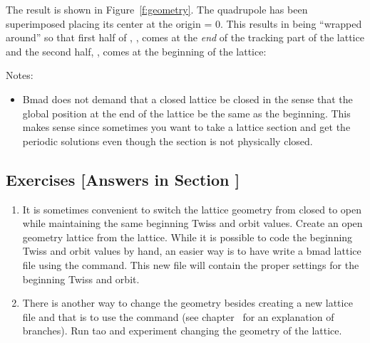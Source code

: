 \documentclass{hitec}     %
\begin{document}
The result is shown in Figure~\ref{f:geometry}. The  quadrupole has been superimposed
placing its center at the origin  = 0. This results in  being ``wrapped around''
so that first half of , , comes at the {\em end} of the tracking part of the lattice
and the second half, , comes at the beginning of the lattice:

Notes:
\vspace{-5 pt}
\begin{itemize}
\item 
Bmad does not demand that a closed lattice be closed in the sense that the global position at the
end of the lattice be the same as the beginning. This makes sense since sometimes you want to take
a lattice section and get the periodic solutions even though the section is not physically closed.
\end{itemize}

\newpage

\subsection{Exercises [Answers in Section ]}
\label{s:lat.geom.ex}

\begin{enumerate}[label=\thesection.\arabic{enumi}]
\item
It is sometimes convenient to switch the lattice geometry from closed to open while maintaining the
same beginning Twiss and orbit values. Create an open geometry lattice from the 
lattice. While it is possible to code the beginning Twiss and orbit values by hand, an easier way is
to have \tao write a bmad lattice file using the  command. This new file will contain
the proper settings for the beginning Twiss and orbit.
%
\item
There is another way to change the geometry besides creating a new lattice file and that is to use
the  command (see chapter~ for an explanation of branches). Run tao and
experiment changing the geometry of the  lattice.
\end{enumerate}
\end{document}
